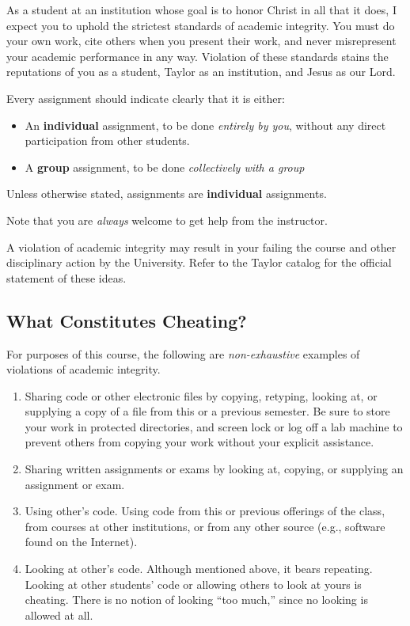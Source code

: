 As a student at an institution whose goal is to honor Christ in all that it does,
I expect you to uphold the strictest standards of academic integrity.
You must do your own work,
cite others when you present their work,
and never misrepresent your academic performance in any way.
Violation of these standards stains the reputations of you as a student,
Taylor as an institution,
and Jesus as our Lord.

Every assignment should indicate clearly
that it is either:
\begin{itemize}
\item An \textbf{individual} assignment,
  to be done \emph{entirely by you},
  without any direct participation from other students.
\item A \textbf{group} assignment, to be done \emph{collectively with a group}
\end{itemize}
Unless otherwise stated,
assignments are \textbf{individual} assignments.

\begin{framed}
Note that you are \emph{always} welcome
to get help from the instructor.
\end{framed}

A violation of academic integrity may result in your failing the course
and other disciplinary action by the University.
Refer to the Taylor catalog for the official statement of these ideas.

\subsection{What Constitutes Cheating?}

For purposes of this course, the following are \emph{non-exhaustive} examples
of violations of academic integrity.
\begin{enumerate}
\item Sharing code or other electronic files by copying, retyping, looking at,
  or supplying a copy of a file from this or a previous semester. Be sure to
  store your work in protected directories, and screen lock or log off a lab
  machine to prevent others from copying your work without your explicit
  assistance.
\item Sharing written assignments or exams by looking at, copying, or supplying
  an assignment or exam.
\item Using other's code. Using code from this or previous offerings of the
  class, from courses at other institutions, or from any other source (e.g.,
  software found on the Internet).
\item Looking at other's code. Although mentioned above, it bears
  repeating. Looking at other students' code or allowing others to look at yours
  is cheating. There is no notion of looking “too much,” since no looking is
  allowed at all.
\end{enumerate}

